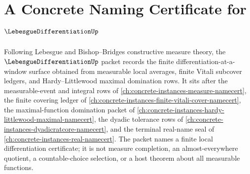\chapter{A Concrete Naming Certificate for $\LebesgueDifferentiationUp$}
\label{ch:concrete-instances-lebesgue-differentiation-namecert}

Following Lebesgue and Bishop--Bridges constructive measure theory, the $\LebesgueDifferentiationUp$ packet records the finite differentiation-at-a-window surface obtained from measurable local averages, finite Vitali subcover ledgers, and Hardy--Littlewood maximal domination rows. It sits after the measurable-event and integral rows of \autoref{ch:concrete-instances-measure-namecert}, the finite covering ledger of \autoref{ch:concrete-instances-finite-vitali-cover-namecert}, the maximal-function domination packet of \autoref{ch:concrete-instances-hardy-littlewood-maximal-namecert}, the dyadic tolerance rows of \autoref{ch:concrete-instances-dyadicratcore-namecert}, and the terminal real-name seal of \autoref{ch:concrete-instances-real-namecert}. The packet names a finite local differentiation certificate; it is not measure completion, an almost-everywhere quotient, a countable-choice selection, or a host theorem about all measurable functions.


